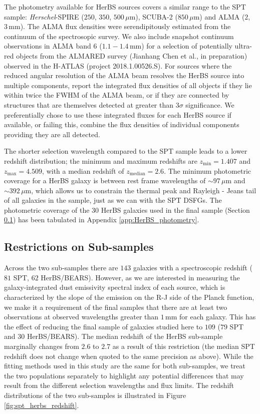 The photometry available for HerBS sources covers a similar range to the SPT sample: \textit{Herschel}-SPIRE ($250$, $350$, $500\,\mu$m), SCUBA-2 ($850\,\mu$m) and ALMA ($2$, $3\,$mm). The ALMA flux densities were serendipitously estimated from the continuum of the spectrosopic survey. We also include snapshot continuum observations in ALMA band 6 ($1.1 - 1.4\,$mm) for a selection of potentially ultra-red objects from the ALMARED survey (Jianhang Chen et al., in preparation) observed in the H-ATLAS (project 2018.1.00526.S). For sources where the reduced angular resolution of the ALMA beam resolves the HerBS source into multiple components, \citealt{Bendo_2023} report the integrated flux densities of all objects if they lie within twice the FWHM of the ALMA beam, or if they are connected by structures that are themselves detected at greater than $3\sigma$ significance. We preferentially chose to use these integrated fluxes for each HerBS source if available, or failing this, combine the flux densities of individual components providing they are all detected.

The shorter selection wavelength compared to the SPT sample leads to a lower redshift distribution; the minimum and maximum redshifts are $z_{\textrm{min}} = 1.407$ and $z_{\textrm{max}} = 4.509$, with a median redshift of $z_{\textrm{median}} = 2.6$. The minimum photometric coverage for a HerBS galaxy is between rest frame wavelengths of $\sim 97\,\mu$m and $\sim 392\,\mu$m, which allows us to constrain the thermal peak and Rayleigh - Jeans tail of all galaxies in the sample, just as we can with the SPT DSFGs. The photometric coverage of the 30 HerBS galaxies used in the final sample (Section \ref{sec:restrictions_on_sample}) has been tabulated in Appendix \ref{app:HerBS_photometry}.

\subsection{Restrictions on Sub-samples}
\label{sec:restrictions_on_sample}

Across the two sub-samples there are $143$ galaxies with a spectroscopic redshift ($81$ SPT, $62$ HerBS/BEARS). However, as we are interested in measuring the galaxy-integrated dust emissivity spectral index of each source, which is characterized by the slope of the emission on the R-J side of the Planck function, we make it a requirement of the final samples that there are at least two observations at observed wavelengths greater than $1\,$mm for each galaxy. This has the effect of reducing the final sample of galaxies studied here to $109$ ($79$ SPT and $30$ HerBS/BEARS). The median redshift of the HerBS sub-sample marginally changes from $2.6$ to $2.7$ as a result of this restriction (the median SPT redshift does not change when quoted to the same precision as above). While the fitting methods used in this study are the same for both sub-samples, we treat the two populations separately to highlight any potential differences that may result from the different selection wavelengths and flux limits. The redshift distributions of the two sub-samples is illustrated in Figure \ref{fig:spt_herbs_redshift}.

